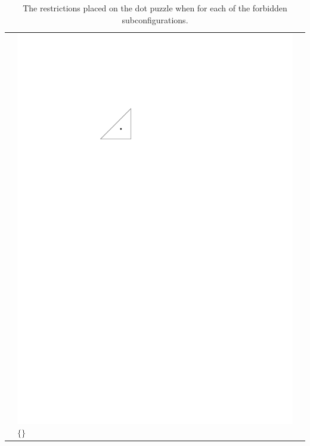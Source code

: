 \documentclass{patmorin}
\begin{document}
\begin{table}
\begin{center}
\begin{tabular}{m{1ex}|>{\centering\arraybackslash}m{}|>{\centering\arraybackslash}m{}}
         & \includegraphics[scale=.8]{figs/killersb-8} \break%
           $\{\}$ \\
\end{tabular}
\end{center}
   \caption{The restrictions placed on the dot puzzle when for each of 
     the forbidden subconfigurations.}
\end{table}
\end{document}
